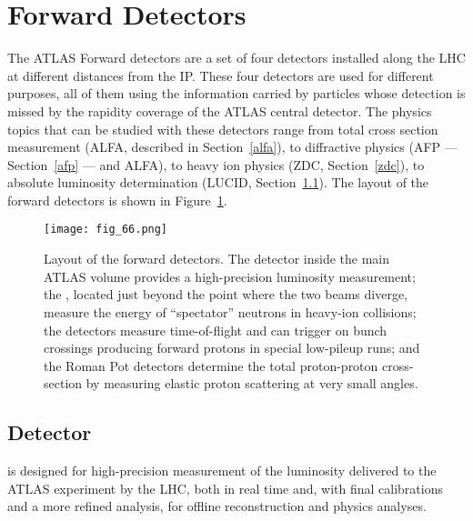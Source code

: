 \documentclass[cernpreprint, atlasdraft=false, UKenglish,british,orcidlogo, texmf, orcidlogo]{atlasdoc}
\begin{document}
 


\clearpage
\newpage
 
\section{Forward Detectors} 
\label{sec:Forward}
 

The ATLAS Forward detectors are a set of four detectors installed along the \gls{LHC} \beampipe at different distances
from the \gls{IP}. These four detectors are used for different purposes, all of them using the information carried by particles whose detection is missed by the rapidity coverage of the ATLAS central detector.
The physics topics that can be studied with these detectors range from total cross section measurement (\gls{ALFA}, described in Section~\ref{alfa}),
to diffractive physics (\gls{AFP} --- Section~\ref{afp} --- and \gls{ALFA}), to heavy ion physics (\gls{ZDC}, Section~\ref{zdc}), to absolute luminosity determination (\gls{LUCID}, Section~\ref{lucid}).
The layout of the forward detectors is shown in Figure~\ref{fig:fwd}.
\begin{figure}[hbtp]
\texttt{[image: fig\_66.png]}
\caption{Layout of the forward detectors.
The  detector inside the main ATLAS volume provides a high-precision luminosity measurement; the , located just beyond the point where the two beams diverge, measure the energy of ``spectator'' neutrons in heavy-ion collisions; the  detectors measure time-of-flight and can trigger on bunch crossings producing forward protons in special low-pileup runs; and the  Roman Pot detectors determine the total proton-proton cross-section by measuring elastic proton scattering at very small angles.
\label{fig:fwd}}
\end{figure}
 

 
\subsection{ Detector}\label{lucid}
 is designed for high-precision measurement of the luminosity delivered to the ATLAS experiment by the \gls{LHC}, both in real time and, with final calibrations and a more refined analysis, for offline reconstruction and physics analyses.
 
\end{document}
